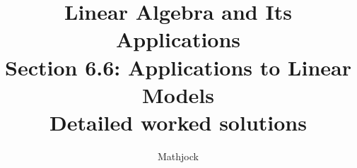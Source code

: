 
\title{\textbf{Linear Algebra and Its Applications}\\[0.3em]Section 6.6: Applications to Linear Models\\[0.3em]\large Detailed worked solutions}
\author{Mathjock}
\date{}

\maketitle
\bookinfo
\tableofcontents
\clearpage
\renewcommand{\thesection}{6.\arabic{section}}
\renewcommand{\theHsection}{6.\arabic{section}}
\setcounter{section}{5}


